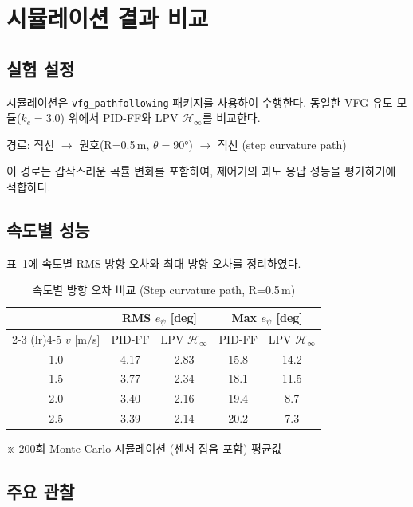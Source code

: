 \section{시뮬레이션 결과 비교}
\label{sec:results}

\subsection{실험 설정}

시뮬레이션은 \texttt{vfg\_pathfollowing} 패키지를 사용하여 수행한다.
동일한 VFG 유도 모듈($k_e = 3.0$) 위에서 PID-FF와 LPV $\mathcal{H}_\infty$를 비교한다.

경로: 직선 $\to$ 원호(R=0.5\,m, $\theta = 90°$) $\to$ 직선 (step curvature path)

이 경로는 갑작스러운 곡률 변화를 포함하여, 제어기의 과도 응답 성능을 평가하기에 적합하다.

\subsection{속도별 성능}

표~\ref{tab:results}에 속도별 RMS 방향 오차와 최대 방향 오차를 정리하였다.

\begin{table}[h]
    \centering
    \caption{속도별 방향 오차 비교 (Step curvature path, R=0.5\,m)}
    \begin{tabular}{ccccc}
        \toprule
        & \multicolumn{2}{c}{RMS $e_\psi$ [deg]} & \multicolumn{2}{c}{Max $e_\psi$ [deg]} \\
        \cmidrule(lr){2-3} \cmidrule(lr){4-5}
        $v$ [m/s] & PID-FF & LPV $\mathcal{H}_\infty$ & PID-FF & LPV $\mathcal{H}_\infty$ \\
        \midrule
        1.0 & 4.17 & 2.83 & 15.8 & 14.2 \\
        1.5 & 3.77 & 2.34 & 18.1 & 11.5 \\
        2.0 & 3.40 & 2.16 & 19.4 & 8.7 \\
        2.5 & 3.39 & 2.14 & 20.2 & 7.3 \\
        \bottomrule
    \end{tabular}
    \label{tab:results}
    \vspace{0.5em}
    \small{※ 200회 Monte Carlo 시뮬레이션 (센서 잡음 포함) 평균값}
\end{table}

\subsection{주요 관찰}

